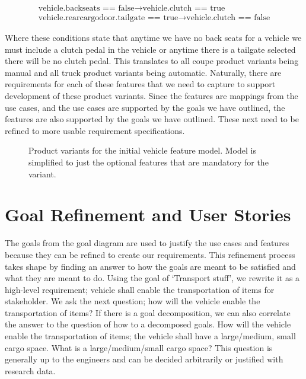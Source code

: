 \begin{gather}
	\text{vehicle.backseats == false} \rightarrow \text{vehicle.clutch == true}\\
	\text{vehicle.rearcargodoor.tailgate == true} \rightarrow \text{vehicle.clutch == false}
\end{gather}

Where these conditions state that anytime we have no back seats for a vehicle we must include a clutch pedal in the vehicle or anytime there is a tailgate selected there will be no clutch pedal. This translates to all coupe product variants being manual and all truck product variants being automatic. Naturally, there are requirements for each of these features that we need to capture to support development of these product variants. Since the features are mappings from the use cases, and the use cases are supported by the goals we have outlined, the features are also supported by the goals we have outlined. These next need to be refined to more usable requirement specifications.

\begin{figure}
	\centering
	
	\caption{Product variants for the initial vehicle feature model. Model is simplified to just the optional features that are mandatory for the variant.}
	\label{fig:veh_variants}
\end{figure}

\section{Goal Refinement and User Stories}

The goals from the goal diagram are used to justify the use cases and features because they can be refined to create our requirements. This refinement process takes shape by finding an answer to how the goals are meant to be satisfied and what they are meant to do. Using the goal of `Transport stuff', we rewrite it as a high-level requirement; vehicle shall enable the transportation of items for stakeholder. We ask the next question; how will the vehicle enable the transportation of items? If there is a goal decomposition, we can also correlate the answer to the question of how to a decomposed goals. How will the vehicle enable the transportation of items; the vehicle shall have a large/medium, small cargo space. What is a large/medium/small cargo space? This question is generally up to the engineers and can be decided arbitrarily or justified with research data. 


